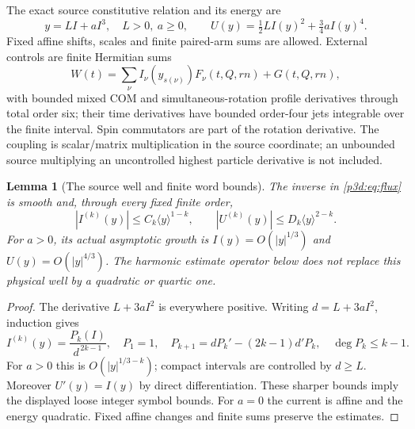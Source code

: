 \documentclass[11pt]{article}
\numberwithin{equation}{section}
\newtheorem{lemma}[theorem]{Lemma}
\theoremstyle{definition}
\theoremstyle{remark}
\begin{document}
The exact source constitutive relation and its energy are
\begin{equation}\label{p3d:eq:flux}
 y=LI+aI^3,\quad L>0,\ a\geq0,\qquad
 U(y)=\tfrac12 LI(y)^2+\tfrac34aI(y)^4.
\end{equation}
Fixed affine shifts, scales and finite paired-arm sums are allowed.
External controls are finite Hermitian sums
\begin{equation}\label{p3d:eq:OLDW}
 W(t)=\sum_\nu I_\nu(y_{s(\nu)})F_\nu(t,Q,rn)+G(t,Q,rn),
\end{equation}
with bounded mixed COM and simultaneous-rotation profile derivatives
through total order six; their time derivatives have bounded order-four
jets integrable over the finite interval. Spin commutators are part of
the rotation derivative. The coupling is scalar/matrix multiplication
in the source coordinate; an unbounded source multiplying an uncontrolled
highest particle derivative is not included.

\begin{lemma}[The source well and finite word bounds]\label{p3d:lem:source}
The inverse in \eqref{p3d:eq:flux} is smooth and, through every fixed
finite order,
\[
 |I^{(k)}(y)|\leq C_k\langle y\rangle^{1-k},\qquad
 |U^{(k)}(y)|\leq D_k\langle y\rangle^{2-k}.
\]
For $a>0$, its actual asymptotic growth is $I(y)=O(|y|^{1/3})$ and
$U(y)=O(|y|^{4/3})$. The harmonic estimate operator below does not
replace this physical well by a quadratic or quartic one.
\end{lemma}
\begin{proof}
The derivative $L+3aI^2$ is everywhere positive. Writing $d=L+3aI^2$,
induction gives
\[
 I^{(k)}(y)=\frac{P_k(I)}{d^{\,2k-1}},\quad
 P_1=1,\quad P_{k+1}=dP_k'-(2k-1)d'P_k,\quad
 \deg P_k\leq k-1.
\]
For $a>0$ this is $O(|y|^{1/3-k})$; compact intervals are controlled by
$d\geq L$. Moreover $U'(y)=I(y)$ by direct differentiation.
These sharper bounds imply the displayed loose integer symbol bounds.
For $a=0$ the current is affine and the energy quadratic.
Fixed affine changes and finite sums preserve the estimates.
\end{proof}
\end{document}
